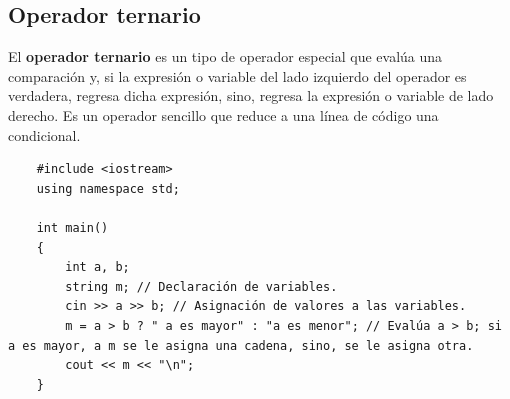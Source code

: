 \subsection{Operador ternario}
\hspace{0.55cm}El \textbf{operador ternario} es un tipo de operador especial que evalúa una comparación y, si la expresión o variable del lado izquierdo del operador es verdadera, regresa dicha expresión, sino, regresa la expresión o variable de lado derecho. Es un operador sencillo que reduce a una línea de código una condicional.
\begin{lstlisting}
    #include <iostream>
    using namespace std;
    
    int main()
    {
        int a, b;
        string m; // Declaración de variables.
        cin >> a >> b; // Asignación de valores a las variables.
        m = a > b ? " a es mayor" : "a es menor"; // Evalúa a > b; si a es mayor, a m se le asigna una cadena, sino, se le asigna otra.
        cout << m << "\n";
    }
\end{lstlisting}